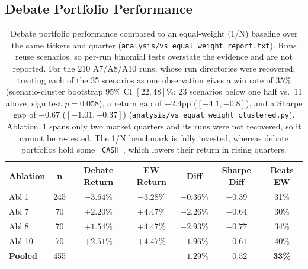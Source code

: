 \documentclass{article}
\begin{document}
\subsection{Debate Portfolio Performance}
\label{app:debate_portofolio}
\begin{table}[H]
\centering
\small
\begin{tabular}{lcccccc}
\toprule
\textbf{Ablation} & \textbf{n} & \textbf{Debate Return} & \textbf{EW Return} & \textbf{Diff} & \textbf{Sharpe Diff} & \textbf{Beats EW} \\
\midrule
Abl 1 & 245 & $-3.64\%$ & $-3.28\%$ & $-0.36\%$ & $-0.39$ & 31\% \\
Abl 7 & 70 & $+2.20\%$ & $+4.47\%$ & $-2.26\%$ & $-0.64$ & 30\% \\
Abl 8 & 70 & $+1.54\%$ & $+4.47\%$ & $-2.93\%$ & $-0.77$ & 34\% \\
Abl 10 & 70 & $+2.51\%$ & $+4.47\%$ & $-1.96\%$ & $-0.61$ & 40\% \\
\textbf{Pooled} & 455 & --- & --- & $\mathbf{-1.29\%}$ & $\mathbf{-0.52}$ & \textbf{33\%} \\
\bottomrule
\end{tabular}
\vspace{4pt}
\caption{Debate portfolio performance compared to an equal-weight (1/N) baseline over the same tickers and quarter (\texttt{analysis/vs\_equal\_weight\_report.txt}). Runs reuse scenarios, so per-run binomial tests overstate the evidence and are not reported. For the 210 A7/A8/A10 runs, whose run directories were recovered, treating each of the 35 scenarios as one observation gives a win rate of 35\% (scenario-cluster bootstrap 95\% CI $[22,48]\%$; 23 scenarios below one half vs.\ 11 above, sign test $p{=}0.058$), a return gap of $-2.4$pp ($[-4.1,-0.8]$), and a Sharpe gap of $-0.67$ ($[-1.01,-0.37]$) (\texttt{analysis/vs\_equal\_weight\_clustered.py}). Ablation~1 spans only two market quarters and its runs were not recovered, so it cannot be re-tested. The 1/N benchmark is fully invested, whereas debate portfolios hold some \texttt{\_CASH\_}, which lowers their return in rising quarters.}
\label{tab:debate_vs_ew}
\end{table}
\end{document}
